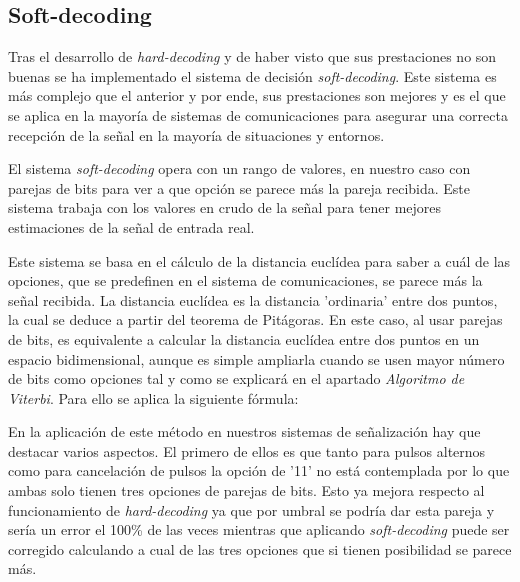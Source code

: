 \subsection{Soft-decoding}
Tras el desarrollo de \textit{hard-decoding} y de haber visto que sus prestaciones no son 
buenas se ha implementado el sistema de decisión \textit{soft-decoding}. 
Este sistema es más complejo que el anterior y por ende, sus prestaciones son mejores y 
es el que se aplica en la mayoría de sistemas de comunicaciones para asegurar una 
correcta recepción de la señal en la mayoría de situaciones y entornos.

El sistema \textit{soft-decoding} opera con un rango de valores, en nuestro caso con 
parejas de bits para ver a que opción se parece más la pareja recibida. Este sistema 
trabaja con los valores en crudo de la señal para tener mejores estimaciones de la señal
de entrada real. 

Este sistema se basa en el cálculo de la distancia euclídea 
para saber a cuál de las opciones, que se predefinen en el sistema de 
comunicaciones, se parece más la señal recibida. La distancia euclídea es la 
distancia 'ordinaria' entre dos puntos, la cual se deduce a partir del teorema de 
Pitágoras. En este caso, al usar parejas de bits, es equivalente a calcular la distancia
euclídea entre dos puntos en un espacio bidimensional, aunque es simple ampliarla cuando se 
usen mayor número de bits como opciones tal y como se explicará en el apartado 
\textit{Algoritmo de Viterbi}. Para ello se aplica la siguiente fórmula:



En la aplicación de este método en nuestros sistemas de señalización hay que destacar 
varios aspectos. El primero de ellos es que
tanto para pulsos alternos como para cancelación de pulsos la opción de 
'11' no está contemplada por lo que ambas solo tienen tres opciones de parejas de bits. 
Esto ya mejora respecto al funcionamiento de \textit{hard-decoding} ya que por umbral se 
podría dar esta pareja y sería un error el 100\% de las veces mientras que aplicando 
\textit{soft-decoding} puede ser corregido calculando a cual de las tres opciones 
que si tienen posibilidad se parece más.

